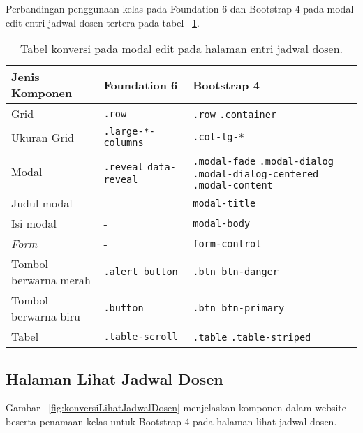 \noindent Perbandingan penggunaan kelas pada Foundation 6 dan Bootstrap 4 pada modal edit entri jadwal dosen tertera pada tabel ~\ref{table:konversiEditEntriJadwalDosen}.\\
\begin{table}[H]
	\caption{Tabel konversi pada modal edit pada halaman entri jadwal dosen.}
	\begin{tabular}{| p{} | p{} | p{} |} 
		\hline
		\textbf{Jenis Komponen} & \textbf{Foundation 6} & \textbf{Bootstrap 4}  \\ [0.5ex] 
		\hline	
		Grid & \texttt{.row} & \texttt{.row} \newline \texttt{.container} \\
		\hline
		Ukuran Grid & \texttt{.large-*-columns} & \texttt{.col-lg-*}\\
		\hline	
		Modal & \texttt{.reveal} \newline \texttt{data-reveal} & \texttt{.modal-fade} \newline \texttt{.modal-dialog} \newline \texttt{.modal-dialog-centered} \newline \texttt{.modal-content} \\
		\hline
		Judul modal & - & \texttt{modal-title}\\
		\hline
		Isi modal & - & \texttt{modal-body}\\
		\hline
		\textit{Form} & - & \texttt{form-control}\\
		\hline
		Tombol berwarna merah & \texttt{.alert button} & \texttt{.btn btn-danger}\\
		\hline		
		Tombol berwarna biru & \texttt{.button}  & \texttt{.btn btn-primary}\\
		\hline
		Tabel & \texttt{.table-scroll} & \texttt{.table} \newline \texttt{.table-striped} \\[1ex]
		\hline
	\end{tabular}
	\label{table:konversiEditEntriJadwalDosen}
\end{table}

\subsection{Halaman Lihat Jadwal Dosen}
\noindent Gambar ~\ref{fig:konversiLihatJadwalDosen} menjelaskan komponen dalam website beserta penamaan kelas untuk Bootstrap 4 pada halaman lihat jadwal dosen.\\

